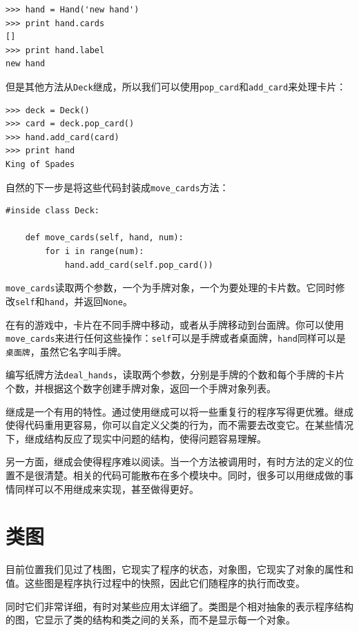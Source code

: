 \beforeverb
\begin{verbatim}
>>> hand = Hand('new hand')
>>> print hand.cards
[]
>>> print hand.label
new hand
\end{verbatim}
\afterverb
%
但是其他方法从{\tt Deck}继成，所以我们可以使用\verb"pop_card"和\verb"add_card"来处理卡片：

\beforeverb
\begin{verbatim}
>>> deck = Deck()
>>> card = deck.pop_card()
>>> hand.add_card(card)
>>> print hand
King of Spades
\end{verbatim}
\afterverb
%
自然的下一步是将这些代码封装成\verb"move_cards"方法：


\beforeverb
\begin{verbatim}
#inside class Deck:

    def move_cards(self, hand, num):
        for i in range(num):
            hand.add_card(self.pop_card())
\end{verbatim}
\afterverb
%
\verb"move_cards"读取两个参数，一个为手牌对象，一个为要处理的卡片数。它同时修改{\tt self}和{\tt hand}，并返回{\tt None}。

在有的游戏中，卡片在不同手牌中移动，或者从手牌移动到台面牌。你可以使用\verb"move_cards"来进行任何这些操作：{\tt self}可以是手牌或者桌面牌，{\tt hand}同样可以是{\tt 桌面牌}，虽然它名字叫手牌。

\begin{ex}
编写纸牌方法\verb"deal_hands"，读取两个参数，分别是手牌的个数和每个手牌的卡片个数，并根据这个数字创建手牌对象，返回一个手牌对象列表。
\end{ex}
继成是一个有用的特性。通过使用继成可以将一些重复行的程序写得更优雅。继成使得代码重用更容易，你可以自定义父类的行为，而不需要去改变它。在某些情况下，继成结构反应了现实中问题的结构，使得问题容易理解。

另一方面，继成会使得程序难以阅读。当一个方法被调用时，有时方法的定义的位置不是很清楚。相关的代码可能散布在多个模块中。同时，很多可以用继成做的事情同样可以不用继成来实现，甚至做得更好。


\section{类图}

目前位置我们见过了栈图，它现实了程序的状态，对象图，它现实了对象的属性和值。这些图是程序执行过程中的快照，因此它们随程序的执行而改变。

同时它们非常详细，有时对某些应用太详细了。类图是个相对抽象的表示程序结构的图，它显示了类的结构和类之间的关系，而不是显示每一个对象。

